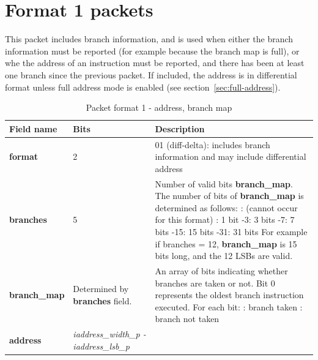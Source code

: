 \FloatBarrier
\section{Format 1 packets} \label{sec:format1}

This packet includes branch information, and is used when either the branch information must be reported 
(for example because the branch map is full), or whe the address of an instruction must be reported, and there has 
been at least one branch since the previous packet.  If included, the address is in differential format unless full 
address mode is enabled (see section~\ref{sec:full-address}).

\begin{table}[htp]
  \centering
  \caption{Packet format 1 - address, branch map}
  \label{tab:te_inst1-addr-map}
  \begin{tabulary}{\textwidth}{|l|p{35mm}|p{90mm}|}
    \hline
    {\bf Field name} & {\bf Bits} & {\bf Description} \\
    \hline
    \textbf{format}	& 2	& 01 (diff-delta): includes branch information and may include differential address\\
    \hline
    \textbf{branches} & 5 & Number of valid bits \textbf{branch\_map}. The number of bits of \textbf{branch\_map} is determined as follows: :	   (cannot occur for this format) :	   1 bit -3:   3 bits -7:   7 bits -15:  15 bits -31: 31 bits \newline
    For example if branches = 12, \textbf{branch\_map} is 15 bits long, and the 12 LSBs are valid. \\
    \hline
    \textbf{branch\_map} & Determined by \newline 
                 \textbf{branches} field. & 
                 An array of bits indicating whether branches are taken or not.\newline
    Bit 0 represents the oldest branch instruction executed.   For each bit: : branch taken : branch not taken \\
    \hline
    \textbf{address}	& \textit {iaddress\_width\_p - iaddress\_lsb\_p} & 

\end{tabulary}
\end{table}
